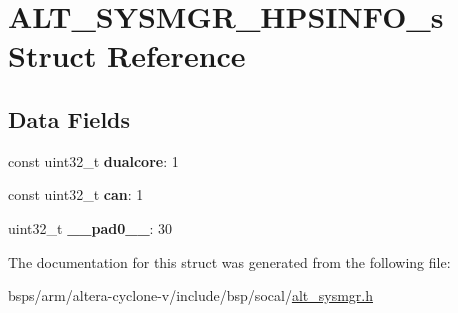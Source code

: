 \hypertarget{structALT__SYSMGR__HPSINFO__s}{}\section{A\+L\+T\+\_\+\+S\+Y\+S\+M\+G\+R\+\_\+\+H\+P\+S\+I\+N\+F\+O\+\_\+s Struct Reference}
\label{structALT__SYSMGR__HPSINFO__s}
\subsection*{Data Fields}
\begin{DoxyCompactItemize}
\item 
\mbox{\label{structALT__SYSMGR__HPSINFO__s_ad776594c5be16078d2ee5dc41c039767}} 
const uint32\+\_\+t {\bfseries dualcore}\+: 1
\item 
\mbox{\label{structALT__SYSMGR__HPSINFO__s_ae63fac4a022628b6910f9ef72b6ab522}} 
const uint32\+\_\+t {\bfseries can}\+: 1
\item 
\mbox{\label{structALT__SYSMGR__HPSINFO__s_ab716aefac1f72b6ae2435296082576d1}} 
uint32\+\_\+t {\bfseries \+\_\+\+\_\+pad0\+\_\+\+\_\+}\+: 30
\end{DoxyCompactItemize}


The documentation for this struct was generated from the following file\+:\begin{DoxyCompactItemize}
\item 
bsps/arm/altera-\/cyclone-\/v/include/bsp/socal/\mbox{\hyperlink{alt__sysmgr_8h}{alt\+\_\+sysmgr.\+h}}\end{DoxyCompactItemize}
